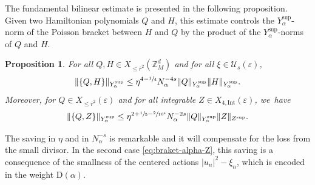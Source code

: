 \documentclass[10pt,a4paper]{amsart}
\theoremstyle{plain}
\newtheorem{proposition}[theorem]{Proposition}
\theoremstyle{definition}
\newcommand{\Z}{\mathbb{Z}}
\newcommand{\1}{\mathbf{1}}
\newcommand{\Ysup}[1]{Y_{#1}^{\mathrm{sup}}}
\let\epsilon\varepsilon
\begin{document}
The fundamental bilinear estimate is presented in the following proposition. Given two Hamiltonian polynomials $Q$ and $H$, this estimate controls the $\Ysup{\alpha}$-norm of the Poisson bracket between $H$ and $Q$ by the product of the $\Ysup{\alpha}$-norms of $Q$ and $H$.
\begin{proposition}
\label{prop:bracket0} For all $Q,H \in X_{\leq\overline{r}^{2}}(\Z_{M}^{d})$ and for all $\xi\in\mathcal{U}_{s}(\epsilon)$,
\begin{equation}
\label{eq:braket-alpha}
\|\{Q,H\}\|_{\Ysup{\alpha}}
\leq \eta^{4-\sfrac{1}{4}}N_{\alpha}^{-4s}
\|Q\|_{\Ysup{\alpha}}
\|H\|_{\Ysup{\alpha}}.
\end{equation}
Moreover, for $Q\in X_{\leq\overline{r}^{2}}(\epsilon)$ and for all integrable $Z\in X_{4,\mathrm{Int}}(\epsilon)$, we~have
\begin{equation}
\label{eq:braket-alpha-Z}
\|\{Q,Z\}\|_{\Ysup{\alpha}} \leq \eta^{2+\sfrac{1}{5}-\sfrac{2}{10^{4}}}N_{\alpha}^{-2s}\|Q\|_{\Ysup{\alpha}}\|Z\|_{Z^{\mathrm{sup}}}.
\end{equation}
\end{proposition}
The saving in $\eta$ and in $N_{\alpha}^{-s}$ is remarkable and it will compensate for the loss from the small divisor. In the second case \eqref{eq:braket-alpha-Z}, this saving is a consequence of the smallness of the centered actions $|u_n|^{2}-\xi_{n}$, which is encoded in the weight $\mathrm{D}(\alpha)$.
\end{document}
